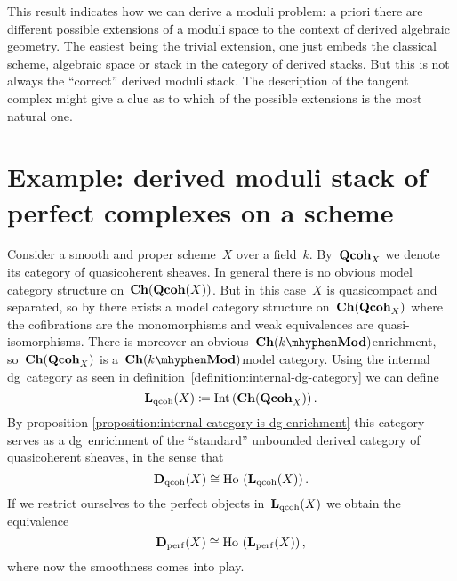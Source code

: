 \begin{refsection}
\begin{remark}
  This result indicates how we can derive a moduli problem: a priori there are different possible extensions of a moduli space to the context of derived algebraic geometry. The easiest being the trivial extension, one just embeds the classical scheme, algebraic space or stack in the category of derived stacks. But this is not always the ``correct'' derived moduli stack. The description of the tangent complex might give a clue as to which of the possible extensions is the most natural one.
\end{remark}


\section{Example: derived moduli stack of perfect complexes on a scheme}
\label{section:example}
Consider a smooth and proper scheme~$X$ over a field~$k$. By~$\mathbf{Qcoh}_X$ we denote its category of quasicoherent sheaves. In general there is no obvious model category structure on~$\mathbf{Ch}(\mathbf{Qcoh}(X))$. But in this case~$X$ is quasicompact and separated, so by \cite{hovey-sheaves} there exists a model category structure on~$\mathbf{Ch}(\mathbf{Qcoh}_X)$ where the cofibrations are the monomorphisms and weak equivalences are quasi-isomorphisms. There is moreover an obvious~$\Ch(k\mhyphen\Mod)$\dash enrichment, so~$\mathbf{Ch}(\mathbf{Qcoh}_X)$ is a~$\Ch(k\mhyphen\Mod)$\dash model category. Using the internal dg~category as seen in definition~\ref{definition:internal-dg-category} we can define
\begin{equation}
  \mathbf{L}_{\mathrm{qcoh}}(X)\coloneqq\operatorname{Int}\left( \mathbf{Ch}(\mathbf{Qcoh}_X) \right).
\end{equation}
By proposition \ref{proposition:internal-category-is-dg-enrichment} this category serves as a dg~enrichment of the ``standard'' unbounded derived category of quasicoherent sheaves, in the sense that
\begin{equation}
  \mathbf{D}_{\mathrm{qcoh}}(X)\cong\operatorname{\mathrm{Ho} \,}\left( \mathbf{L}_{\mathrm{qcoh}}(X) \right).
\end{equation}
If we restrict ourselves to the perfect objects in~$\mathbf{L}_{\mathrm{qcoh}}(X)$ we obtain the equivalence
\begin{equation}
  \mathbf{D}_{\mathrm{perf}}(X)\cong\operatorname{\mathrm{Ho} \,}\left( \mathbf{L}_{\mathrm{perf}}(X) \right),
\end{equation}
where now the smoothness comes into play.


\end{refsection}
